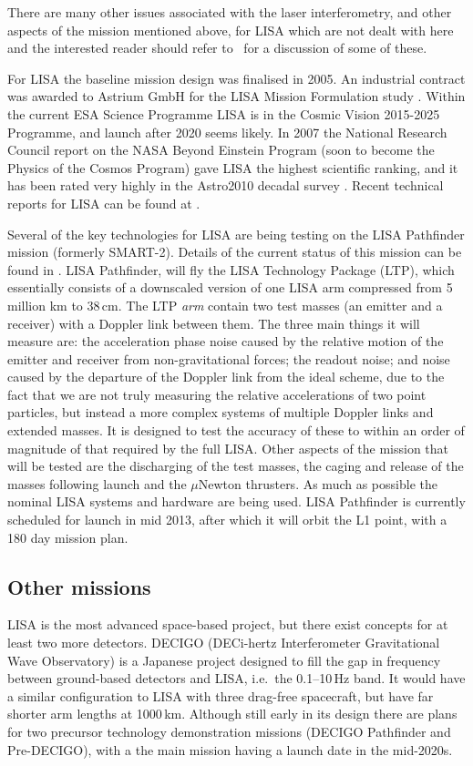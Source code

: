 \documentclass{article}
\begin{document}
There are many other issues associated with the laser interferometry, and other
aspects of the mission mentioned above, for LISA which are not dealt with here
and the interested reader should refer to~\cite{Houghetal, Jennrich:2009,
Johann:2008} for a discussion of some of these.

For LISA the baseline mission design was finalised in 2005. An industrial
contract was awarded to Astrium GmbH for the LISA Mission Formulation study
\cite{Johann:2008}. Within the current ESA Science Programme LISA is in the
Cosmic Vision 2015-2025 Programme, and launch after 2020 seems likely. 
In 2007 the National Research
Council report on the NASA Beyond Einstein Program (soon to become the Physics
of the Cosmos Program) gave LISA the highest scientific ranking, and it has
been rated very highly in the Astro2010 decadal survey \cite{astro2010}. Recent
technical reports for LISA can be found at \cite{LISATechReports}.

Several of the key technologies for LISA are being testing on the LISA
Pathfinder mission (formerly SMART-2). Details of the current status of this
mission can be found in \cite{Armano:2009}. LISA Pathfinder, will fly the
LISA Technology Package (LTP), which essentially consists of a downscaled
version of one LISA arm compressed from 5 million km to 38\,cm. The LTP {\it arm}
contain two test masses (an emitter and a receiver) with a Doppler link
between them. The three main things it will measure are: the acceleration phase
noise caused by the relative motion of the emitter and receiver from
non-gravitational forces; the readout noise; and noise caused by the departure
of the Doppler link from the ideal scheme, due to the fact that we are not
truly measuring the relative accelerations of two point particles, but instead
a more complex systems of multiple Doppler links and extended masses. It is
designed to test the accuracy of these to within an order of magnitude of that required by
the full LISA. Other aspects of the mission that will be tested are the
discharging of the test masses, the caging and release of the masses following
launch and the $\mu$Newton thrusters. As much as possible the nominal LISA
systems and hardware are being used. LISA Pathfinder is currently scheduled for
launch in mid 2013, after which it will orbit the L1 point, with a 180 day
mission plan.

\subsection{Other missions}
LISA is the most advanced space-based project, but there exist concepts for at
least two more detectors. DECIGO (DECi-hertz Interferometer Gravitational Wave
Observatory) \cite{Sato:2009} is a Japanese project designed to fill the gap in
frequency between ground-based detectors and LISA, i.e.\ the 0.1--10\,Hz band. It
would have a similar configuration to LISA with three drag-free spacecraft, but
have far shorter arm lengths at 1000\,km. Although still early in its design
there are plans for two precursor technology demonstration missions (DECIGO
Pathfinder \cite{Ando:2009} and Pre-DECIGO), with a the main mission having a
launch date in the mid-2020s.
\end{document}
